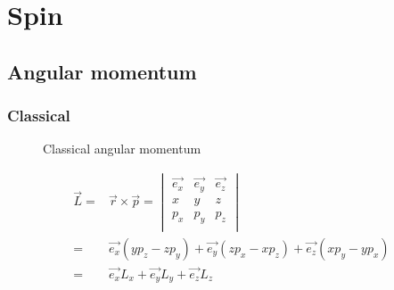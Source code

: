 \section{Spin}
	\subsection{Angular momentum}
		\subsubsection{Classical}
			\begin{figure}[!h]
				\centering
				
				\caption{Classical angular momentum}
				\label{clasmoment}
			\end{figure}
			
			\begin{align}
				\vec{L} =& \vec{r}\times\vec{p} =
				\begin{vmatrix}
					\vec{e_x} & \vec{e_y} & \vec{e_z} \\
					x & y & z \\
					p_x & p_y & p_z \\
				\end{vmatrix} \\
				=& \vec{e_x}(yp_z - zp_y) + \vec{e_y}(zp_x - xp_z) + \vec{e_z}(xp_y - yp_x) \\
				=& \vec{e_x}L_x + \vec{e_y}L_y + \vec{e_z}L_z
			\end{align}
			
